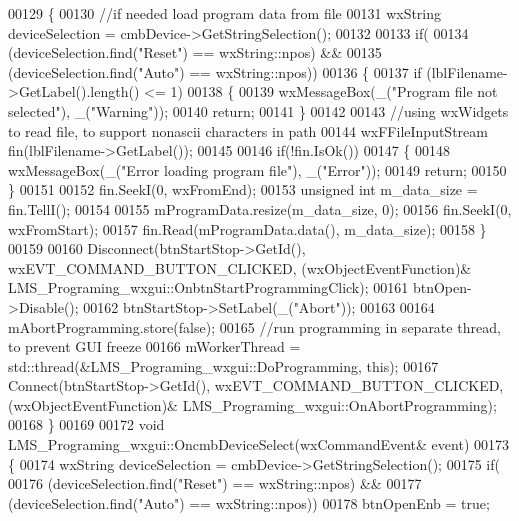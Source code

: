 \begin{DoxyCode}
00129 \{
00130     \textcolor{comment}{//if needed load program data from file}
00131     wxString deviceSelection = cmbDevice->GetStringSelection();
00132 
00133     \textcolor{keywordflow}{if}(
00134         (deviceSelection.find(\textcolor{stringliteral}{"Reset"}) == wxString::npos) &&
00135         (deviceSelection.find(\textcolor{stringliteral}{"Auto"}) == wxString::npos))
00136     \{
00137         \textcolor{keywordflow}{if} (lblFilename->GetLabel().length() <= 1)
00138         \{
00139             wxMessageBox(\_(\textcolor{stringliteral}{"Program file not selected"}), \_(\textcolor{stringliteral}{"Warning"}));
00140             \textcolor{keywordflow}{return};
00141         \}
00142 
00143         \textcolor{comment}{//using wxWidgets to read file, to support nonascii characters in path}
00144         wxFFileInputStream fin(lblFilename->GetLabel());
00145 
00146         \textcolor{keywordflow}{if}(!fin.IsOk())
00147         \{
00148             wxMessageBox(\_(\textcolor{stringliteral}{"Error loading program file"}), \_(\textcolor{stringliteral}{"Error"}));
00149             \textcolor{keywordflow}{return};
00150         \}
00151 
00152         fin.SeekI(0, wxFromEnd);
00153         \textcolor{keywordtype}{unsigned} \textcolor{keywordtype}{int} m\_data\_size = fin.TellI();
00154 
00155         mProgramData.resize(m\_data\_size, 0);
00156         fin.SeekI(0, wxFromStart);
00157         fin.Read(mProgramData.data(), m\_data\_size);
00158     \}
00159 
00160     Disconnect(btnStartStop->GetId(), wxEVT\_COMMAND\_BUTTON\_CLICKED, (wxObjectEventFunction)&
      LMS_Programing_wxgui::OnbtnStartProgrammingClick);
00161     btnOpen->Disable();
00162     btnStartStop->SetLabel(\_(\textcolor{stringliteral}{"Abort"}));
00163 
00164     mAbortProgramming.store(\textcolor{keyword}{false});
00165     \textcolor{comment}{//run programming in separate thread, to prevent GUI freeze}
00166     mWorkerThread = std::thread(&LMS_Programing_wxgui::DoProgramming, \textcolor{keyword}{this});
00167     Connect(btnStartStop->GetId(), wxEVT\_COMMAND\_BUTTON\_CLICKED, (wxObjectEventFunction)&
      LMS_Programing_wxgui::OnAbortProgramming);
00168 \}
00169 
00172 \textcolor{keywordtype}{void} LMS_Programing_wxgui::OncmbDeviceSelect(wxCommandEvent& event)
00173 \{
00174     wxString deviceSelection = cmbDevice->GetStringSelection();
00175     \textcolor{keywordflow}{if}(
00176         (deviceSelection.find(\textcolor{stringliteral}{"Reset"}) == wxString::npos) &&
00177         (deviceSelection.find(\textcolor{stringliteral}{"Auto"}) == wxString::npos))
00178         btnOpenEnb = \textcolor{keyword}{true};

\end{DoxyCode}

